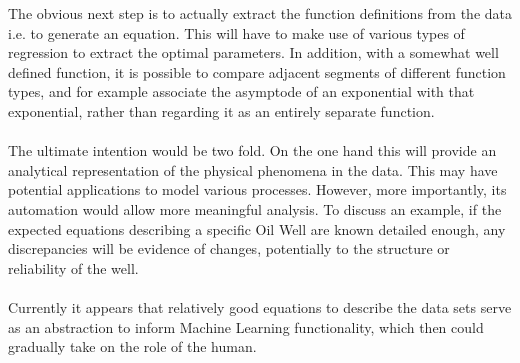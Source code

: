 \documentclass[main.tex]{subfiles}
\begin{document}
    The obvious next step is to actually extract the function definitions from the data i.e. to generate an equation. This will have to make use of various types of regression to extract the optimal parameters. In addition, with a somewhat well defined function, it is possible to compare adjacent segments of different function types, and for example associate the asymptode of an exponential with that exponential, rather than regarding it as an entirely separate function.
    \\\\
    The ultimate intention would be two fold. On the one hand this will provide an analytical representation of the physical phenomena in the data. This may have potential applications to model various processes. However, more importantly, its automation would allow more meaningful analysis. To discuss an example, if the expected equations describing a specific Oil Well are known detailed enough, any discrepancies will be evidence of changes, potentially to the structure or reliability of the well.
    \\\\
    Currently it appears that relatively good equations to describe the data sets serve as an abstraction to inform Machine Learning functionality, which then could gradually take on the role of the human.
    
\end{document}
